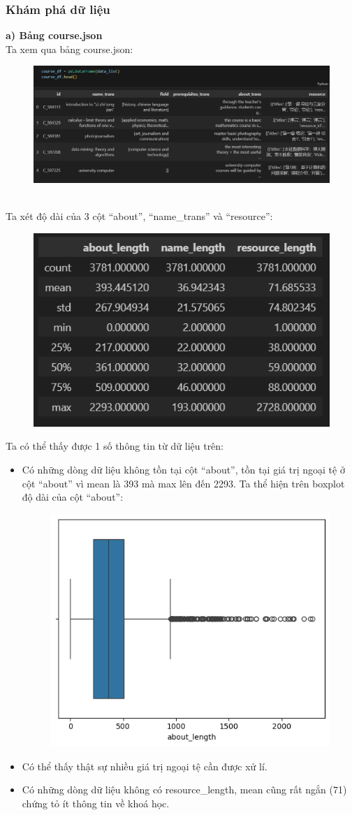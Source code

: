 \subsubsection{Khám phá dữ liệu}
\textbf{a) Bảng course.json}\\
Ta xem qua bảng course.json:
\begin{figure}[h]
    \centering
    \includegraphics[width=1\linewidth]{figures/7.png}
\end{figure}\\
Ta xét độ dài của 3 cột “about”, “name\_trans” và “resource”:
\begin{figure}[h]
    \centering
    \includegraphics[width=0.485\linewidth]{figures/8.png}
\end{figure}
\newpage
Ta có thể thấy được 1 số thông tin từ dữ liệu trên:
\begin{itemize}
    \item Có những dòng dữ liệu không tồn tại cột “about”, tồn tại giá trị ngoại tệ ở cột “about” vì mean là 393 mà max lên đến 2293. Ta thể hiện trên boxplot độ dài của cột “about”:
    \begin{figure}[h]
        \centering
        \includegraphics[width=0.75\linewidth]{figures/9.png}
    \end{figure}
    \item Có thể thấy thật sự nhiều giá trị ngoại tệ cần được xử lí.
    \item Có những dòng dữ liệu không có resource\_length, mean cũng rất ngắn (71) chứng tỏ ít thông tin về khoá học.
\end{itemize}

